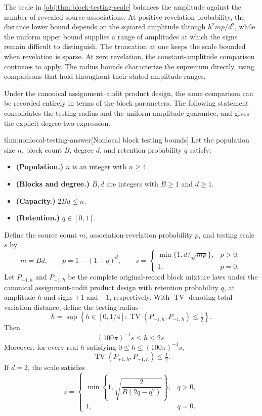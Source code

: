 \documentclass[11pt]{article}
\begin{document}
The scale in \cref{obj:thm:block-testing-scale} balances the amplitude against the number of revealed source associations. At positive revelation probability, the distance lower bound depends on the squared amplitude through \(h^2mp/d^2\), while the uniform upper bound supplies a range of amplitudes at which the signs remain difficult to distinguish. The truncation at one keeps the scale bounded when revelation is sparse. At zero revelation, the constant-amplitude comparison continues to apply. The radius bounds characterize the supremum directly, using comparisons that hold throughout their stated amplitude ranges.

Under the canonical assignment--audit product design, the same comparison can be recorded entirely in terms of the block parameters. The following statement consolidates the testing radius and the uniform amplitude guarantee, and gives the explicit degree-two expression.

\begin{theoremv}{thm:nonlocal-testing-answer}[Nonlocal block testing bounds]
Let the population size \(n\), block count \(B\), degree \(d\), and retention probability \(q\) satisfy:
\begin{itemize}
\item \textbf{(Population.)} \(n\) is an integer with \(n\ge4\).
\item \textbf{(Blocks and degree.)} \(B,d\) are integers with \(B\ge1\) and \(d\ge1\).
\item \textbf{(Capacity.)} \(2Bd\le n\).
\item \textbf{(Retention.)} \(q\in[0,1]\).
\end{itemize}
Define the source count \(m\), association-revelation probability \(p\), and testing scale \(s\) by
\[
m=Bd,\qquad p=1-(1-q)^d,\qquad
s=
\begin{cases}
\min\{1,d/\sqrt{mp}\},&p>0,\\
1,&p=0.
\end{cases}
\]
Let \(P_{+1,h}\) and \(P_{-1,h}\) be the complete original-record block mixture laws under the canonical assignment-audit product design with retention probability \(q\), at amplitude \(h\) and signs \(+1\) and \(-1\), respectively. With \(\operatorname{TV}\) denoting total-variation distance, define the testing radius
\[
\bar h
=\sup\left\{h\in[0,1/4]:
\operatorname{TV}(P_{+1,h},P_{-1,h})\le\tfrac12\right\}.
\]
Then
\[
(100\pi)^{-1}s\le\bar h\le2s.
\]
Moreover, for every real \(h\) satisfying \(0\le h\le(100\pi)^{-1}s\),
\[
\operatorname{TV}(P_{+1,h},P_{-1,h})\le\tfrac12.
\]
If \(d=2\), the scale satisfies
\[
s=
\begin{cases}
\min\left\{1,\sqrt{\dfrac{2}{B(2q-q^2)}}\right\},&q>0,\\
1,&q=0.
\end{cases}
\]
\end{theoremv}
\end{document}
